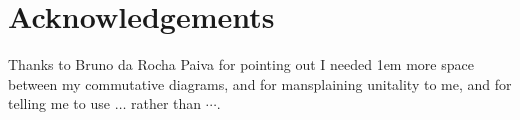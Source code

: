 \chapter{Acknowledgements}\label{chap:acknowledgements}

Thanks to Bruno da Rocha Paiva for pointing out I needed 1em more space between
my commutative diagrams, and for mansplaining unitality to me, and for telling
me to use \(\dots\) rather than \(\cdots\).

